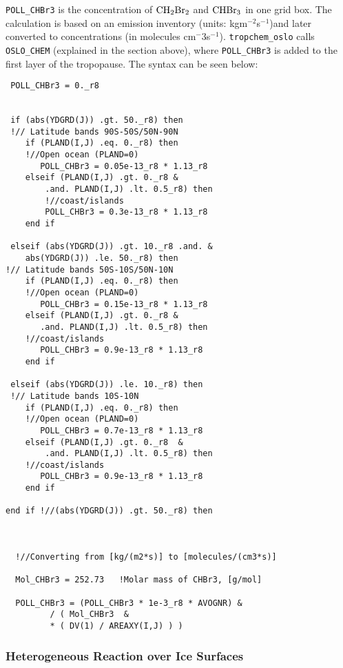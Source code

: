 \texttt{POLL\_CHBr3} is the concentration of $\mathrm{CH_2Br_2}$ and $\mathrm{CHBr_3}$ in one grid box. The calculation is based on an emission inventory  (units: kgm$^{-2}$s$^{-1}$)and later converted to concentrations (in molecules cm$^-{3}$s$^{-1}$). \texttt{tropchem\_oslo} calls \texttt{OSLO\_CHEM} (explained in the section above), where \texttt{POLL\_CHBr3} is added to the first layer of the tropopause. The syntax can be seen below:


\begin{lstlisting}
 POLL_CHBr3 = 0._r8

 
 if (abs(YDGRD(J)) .gt. 50._r8) then
 !// Latitude bands 90S-50S/50N-90N
    if (PLAND(I,J) .eq. 0._r8) then   
    !//Open ocean (PLAND=0)
       POLL_CHBr3 = 0.05e-13_r8 * 1.13_r8
    elseif (PLAND(I,J) .gt. 0._r8 &
        .and. PLAND(I,J) .lt. 0.5_r8) then
        !//coast/islands
        POLL_CHBr3 = 0.3e-13_r8 * 1.13_r8
    end if

 elseif (abs(YDGRD(J)) .gt. 10._r8 .and. &
    abs(YDGRD(J)) .le. 50._r8) then 
!// Latitude bands 50S-10S/50N-10N
    if (PLAND(I,J) .eq. 0._r8) then   
    !//Open ocean (PLAND=0)
       POLL_CHBr3 = 0.15e-13_r8 * 1.13_r8
    elseif (PLAND(I,J) .gt. 0._r8 &
       .and. PLAND(I,J) .lt. 0.5_r8) then
    !//coast/islands
       POLL_CHBr3 = 0.9e-13_r8 * 1.13_r8
    end if

 elseif (abs(YDGRD(J)) .le. 10._r8) then
 !// Latitude bands 10S-10N
    if (PLAND(I,J) .eq. 0._r8) then   
    !//Open ocean (PLAND=0)
       POLL_CHBr3 = 0.7e-13_r8 * 1.13_r8
    elseif (PLAND(I,J) .gt. 0._r8  & 
        .and. PLAND(I,J) .lt. 0.5_r8) then
    !//coast/islands
       POLL_CHBr3 = 0.9e-13_r8 * 1.13_r8
    end if

end if !//(abs(YDGRD(J)) .gt. 50._r8) then 



  !//Converting from [kg/(m2*s)] to [molecules/(cm3*s)]

  Mol_CHBr3 = 252.73   !Molar mass of CHBr3, [g/mol]

  POLL_CHBr3 = (POLL_CHBr3 * 1e-3_r8 * AVOGNR) &
         / ( Mol_CHBr3  &
         * ( DV(1) / AREAXY(I,J) ) )

\end{lstlisting}

\subsubsection{Heterogeneous Reaction over Ice Surfaces}\label{sec:impl_multiphase_react}

